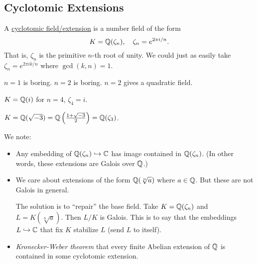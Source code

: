 \subsection{Cyclotomic Extensions}
\begin{definition}
    A \ul{cyclotomic field/extension} is a number field of the form
    \[K = \mathbb Q(\zeta_n), \quad \zeta_n = e^{2\pi i / n}.\]
    That is, $\zeta_n$ is the primitive $n$-th root of unity. We could just as easily take $\zeta_n = e^{2\pi i k / n}$ where $\gcd(k, n) = 1$.
\end{definition}
\begin{example}
    $n = 1$ is boring. $n = 2$ is boring. $n = 2$ gives a quadratic field.
\end{example}
\begin{example}
    $K = \mathbb Q(i)$ for $n=4$, $\zeta_4 = i$.

    $K = \mathbb Q(\sqrt{-3}) = \mathbb Q\left(\frac{1 + \sqrt{-3}}{2}\right) = \mathbb Q(\zeta_3)$.
\end{example}

We note:
\begin{itemize}
    \item
          Any embedding of $\mathbb Q(\zeta_n)\hookrightarrow \mathbb C$ has image contained in $\mathbb Q(\zeta_n)$. (In other words, these extensions are Galois over $\mathbb Q$.)
    \item
          We care about extensions of the form $\mathbb Q(\sqrt[n]{a})$ where $a\in\mathbb Q$. But these are not Galois in general.

          The solution is to ``repair'' the base field. Take $K = \mathbb Q(\zeta_n)$ and $L = K(\sqrt[n]{a})$. Then $L/K$ is Galois. This is to say that the embeddings $L\hookrightarrow \mathbb C$ that fix $K$ stabilize $L$ (send $L$ to itself).
    \item \emph{Kronecker-Weber theorem} that every finite Abelian extension of $\mathbb Q$ is contained in some cyclotomic extension.
\end{itemize}

